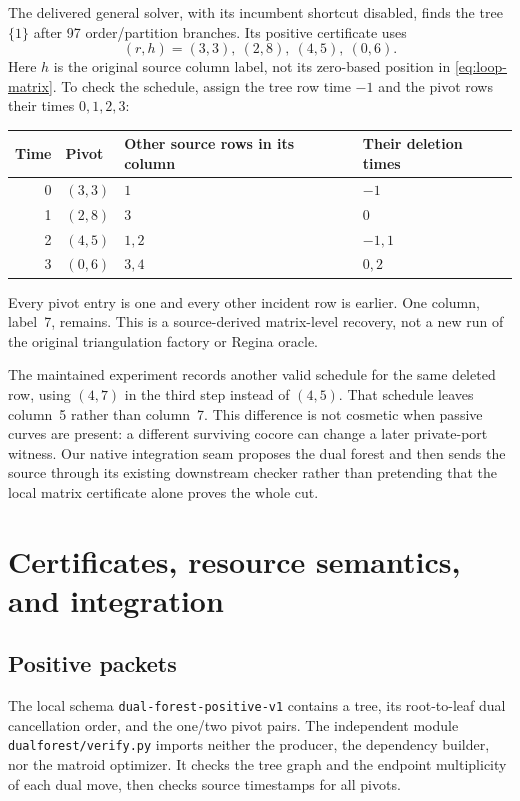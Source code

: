 \documentclass[11pt,letterpaper]{article}
\theoremstyle{definition}
\theoremstyle{remark}
\newcommand{\code}[1]{\nolinkurl{#1}}
\begin{document}
The delivered general solver, with its incumbent shortcut disabled, finds the
tree $\{1\}$ after 97 order/partition branches. Its positive certificate uses
\begin{equation}\label{eq:loop-pivots}
 (r,h)=(3,3),\ (2,8),\ (4,5),\ (0,6).
\end{equation}
Here $h$ is the original source column label, not its zero-based position in
\eqref{eq:loop-matrix}. To check the schedule, assign the tree row time $-1$ and
the pivot rows their times $0,1,2,3$:
\begin{center}
\begin{tabular}{rlll}
\toprule
Time & Pivot & Other source rows in its column & Their deletion times\\
\midrule
0 & $(3,3)$ & $1$ & $-1$\\
1 & $(2,8)$ & $3$ & $0$\\
2 & $(4,5)$ & $1,2$ & $-1,1$\\
3 & $(0,6)$ & $3,4$ & $0,2$\\
\bottomrule
\end{tabular}
\end{center}
Every pivot entry is one and every other incident row is earlier. One column,
label~7, remains. This is a source-derived matrix-level recovery, not a new run
of the original triangulation factory or Regina oracle.

The maintained experiment records another valid schedule for the same deleted
row, using $(4,7)$ in the third step instead of $(4,5)$. That schedule leaves
column~5 rather than column~7. This difference is not cosmetic when passive
curves are present: a different surviving cocore can change a later private-port
witness. Our native integration seam proposes the dual forest and then sends the
source through its existing downstream checker rather than pretending that the
local matrix certificate alone proves the whole cut.

\section{Certificates, resource semantics, and integration}\label{sec:implementation}
\subsection{Positive packets}
The local schema \code{dual-forest-positive-v1} contains a tree, its root-to-leaf
dual cancellation order, and the one/two pivot pairs. The independent module
\code{dualforest/verify.py} imports neither the producer, the dependency builder,
nor the matroid optimizer. It checks the tree graph and the endpoint multiplicity
of each dual move, then checks source timestamps for all pivots.
\end{document}
